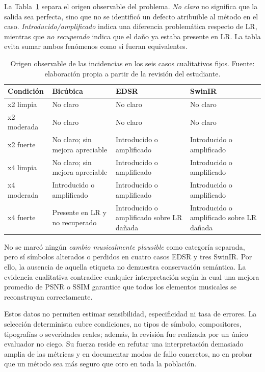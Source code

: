 La Tabla~\ref{tab:qualitative-origin} separa el origen observable del problema. \emph{No claro} no
significa que la salida sea perfecta, sino que no se identificó un defecto atribuible al método en
el caso. \emph{Introducido/amplificado} indica una diferencia problemática respecto de LR, mientras
que \emph{no recuperado} indica que el daño ya estaba presente en LR. La tabla evita sumar ambos
fenómenos como si fueran equivalentes.

\begin{table}[htbp]
  \centering
  \footnotesize
  \setlength{\tabcolsep}{3pt}
  \caption{Origen observable de las incidencias en los seis casos cualitativos fijos. Fuente:
  elaboración propia a partir de la revisión del estudiante.}
  \label{tab:qualitative-origin}
  \begin{tabular}{p{}p{}p{}p{}}
    \toprule
    Condición & Bicúbica & EDSR & SwinIR \\
    \midrule
    x2 limpia & No claro & No claro & No claro \\
    x2 moderada & No claro & No claro & No claro \\
    x2 fuerte & No claro; sin mejora apreciable & Introducido o amplificado & Introducido o amplificado \\
    x4 limpia & No claro; sin mejora apreciable & Introducido o amplificado & Introducido o amplificado \\
    x4 moderada & Introducido o amplificado & Introducido o amplificado & Introducido o amplificado \\
    x4 fuerte & Presente en LR y no recuperado & Introducido o amplificado sobre LR dañada & Introducido o amplificado sobre LR dañada \\
    \bottomrule
  \end{tabular}
\end{table}

No se marcó ningún \emph{cambio musicalmente plausible} como categoría separada, pero sí símbolos
alterados o perdidos en cuatro casos EDSR y tres SwinIR. Por ello, la ausencia de aquella etiqueta
no demuestra conservación semántica. La evidencia cualitativa contradice cualquier interpretación
según la cual una mejora promedio de PSNR o SSIM garantice que todos los elementos musicales se
reconstruyan correctamente.

Estos datos no permiten estimar sensibilidad, especificidad ni tasa de errores. La selección
determinista cubre condiciones, no tipos de símbolo, compositores, tipografías o severidades reales;
además, la revisión fue realizada por un único evaluador no ciego. Su fuerza reside en refutar una
interpretación demasiado amplia de las métricas y en documentar modos de fallo concretos, no en
probar que un método sea más seguro que otro en toda la población.

